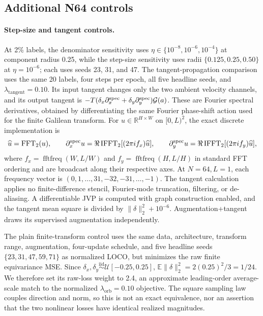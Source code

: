 \subsection{Additional N64 controls}

\paragraph{Step-size and tangent controls.}
At 2\% labels, the denominator sensitivity uses
\(\eta\in\{10^{-8},10^{-6},10^{-4}\}\) at component radius 0.25, while the
step-size sensitivity uses radii \(\{0.125,0.25,0.50\}\) at \(\eta=10^{-6}\);
each uses seeds 23, 31, and 47.  The tangent-propagation comparison uses the same 20
labels, four steps per epoch, all five headline seeds, and
\(\lambda_{\mathrm{tangent}}=0.10\).  Its input tangent changes only the two ambient
velocity channels, and its output tangent is
\(-T(\delta_x\partial_x^{\rm spec}+\delta_y\partial_y^{\rm spec})\mathcal G(a)\).
These are Fourier spectral derivatives, obtained by differentiating the same
Fourier phase-shift action used for the finite Galilean transform.  For
\(u\in\mathbb R^{H\times W}\) on \([0,L)^2\), the exact discrete implementation is
\[
\widehat u=\operatorname{FFT}_2(u),\qquad
\partial_x^{\rm spec}u=
\Re\operatorname{IFFT}_2[(2\pi i f_x)\widehat u],\qquad
\partial_y^{\rm spec}u=
\Re\operatorname{IFFT}_2[(2\pi i f_y)\widehat u],
\]
where \(f_x=\operatorname{fftfreq}(W,L/W)\) and
\(f_y=\operatorname{fftfreq}(H,L/H)\) in standard FFT ordering and are broadcast
along their respective axes.  At \(N=64,L=1\), each frequency vector is
\((0,1,\ldots,31,-32,-31,\ldots,-1)\).  The tangent calculation applies no
finite-difference stencil, Fourier-mode truncation, filtering, or de-aliasing.  A
differentiable JVP is computed with graph construction enabled, and the tangent
mean square is divided by \(\lVert\delta\rVert_2^2+10^{-6}\).
Augmentation+tangent draws its supervised augmentation independently.

The plain finite-transform control uses the same data, architecture, transform
range, augmentation, four-update schedule, and five headline seeds
\(\{23,31,47,59,71\}\) as normalized LOCO, but minimizes the raw finite
equivariance MSE.  Since
\(\delta_x,\delta_y\stackrel{\mathrm{iid}}{\sim}\mathcal U[-0.25,0.25]\),
\(\mathbb E\lVert\delta\rVert_2^2=2(0.25)^2/3=1/24\).  We therefore set its
raw-loss weight to 2.4, an approximate leading-order average-scale match to the
normalized \(\lambda_{\mathrm{orb}}=0.10\) objective.  The square sampling law
couples direction and norm, so this is not an exact equivalence, nor an assertion
that the two nonlinear losses have identical realized magnitudes.

